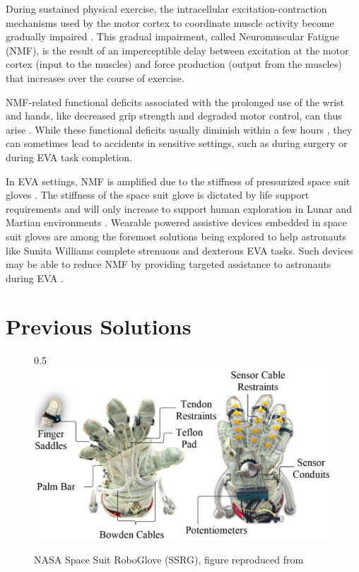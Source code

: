 \documentclass{article}
\begin{document}
During sustained physical exercise, the intracellular excitation-contraction mechanisms used by the motor cortex to coordinate muscle activity become gradually impaired \cite{Boyas2011NMF}. This gradual impairment, called Neuromuscular Fatigue (NMF), is the result of an imperceptible delay between excitation at the motor cortex (input to the muscles) and force production (output from the muscles) that increases over the course of exercise. 

NMF-related functional deficits associated with the prolonged use of the wrist and hands, like decreased grip strength and degraded motor control, can thus arise \cite{Boyas2011NMF}. While these functional deficits usually diminish within a few hours \cite{Boyas2011NMF}, they can sometimes lead to accidents in sensitive settings, such as during surgery or during EVA task completion.

In EVA settings, NMF is amplified due to the stiffness of pressurized space suit gloves \cite{Madden2017TheIO, Rogers2017DevelopmentAT}. The stiffness of the space suit glove is dictated by life support requirements and will only increase to support human exploration in Lunar and Martian environments \cite{NASAHumanResearcherEvidenceBook}. Wearable powered assistive devices embedded in space suit gloves are among the foremost solutions being explored to help astronauts like Sunita Williams complete strenuous and dexterous EVA tasks. Such devices may be able to reduce NMF by providing targeted assistance to astronauts during EVA \cite{Madden2017TheIO}. 

\section{Previous Solutions}

\begin{figure}{0.5\textwidth}
    \centering
        \includegraphics[width=0.5\columnwidth]{figures/SSRG1.png}
        \caption{NASA Space Suit RoboGlove (SSRG), figure reproduced from \cite{Rogers2017DevelopmentAT}}
        \label{fig:SSRG}
\end{figure}
\end{document}
